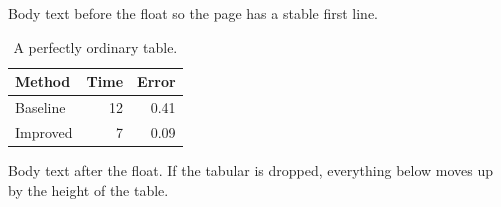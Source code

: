 \documentclass{article}
\begin{document}
Body text before the float so the page has a stable first line.

\begin{table}[h]
\centering
\caption{A perfectly ordinary table.}
\begin{tabular}{lrr}
\hline
Method & Time & Error \\
\hline
Baseline & 12 & 0.41 \\
Improved & 7 & 0.09 \\
\hline
\end{tabular}
\end{table}

Body text after the float. If the tabular is dropped, everything below moves
up by the height of the table.
\end{document}
